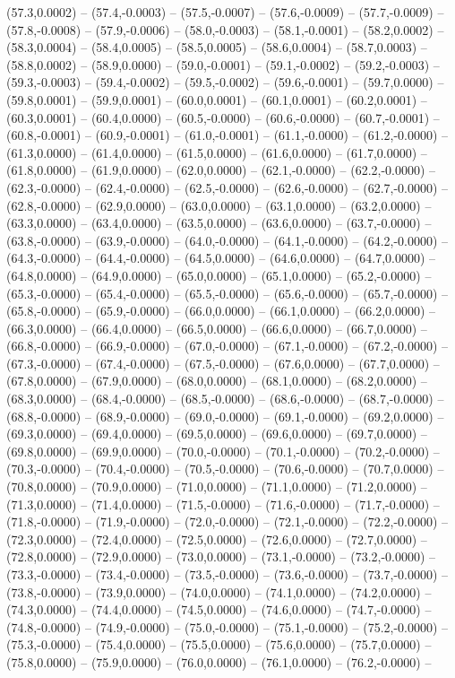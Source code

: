 \documentclass{SVnote}
\begin{document}
(57.3,0.0002) -- (57.4,-0.0003) -- (57.5,-0.0007) -- (57.6,-0.0009) -- (57.7,-0.0009) -- (57.8,-0.0008) -- (57.9,-0.0006) -- (58.0,-0.0003) -- (58.1,-0.0001) -- (58.2,0.0002) -- (58.3,0.0004) -- (58.4,0.0005) -- (58.5,0.0005) -- (58.6,0.0004) -- (58.7,0.0003) -- (58.8,0.0002) -- (58.9,0.0000) -- (59.0,-0.0001) -- (59.1,-0.0002) -- (59.2,-0.0003) -- (59.3,-0.0003) -- (59.4,-0.0002) -- (59.5,-0.0002) -- (59.6,-0.0001) -- (59.7,0.0000) -- (59.8,0.0001) -- (59.9,0.0001) -- (60.0,0.0001) -- (60.1,0.0001) -- (60.2,0.0001) -- (60.3,0.0001) -- (60.4,0.0000) -- (60.5,-0.0000) -- (60.6,-0.0000) -- (60.7,-0.0001) -- (60.8,-0.0001) -- (60.9,-0.0001) -- (61.0,-0.0001) -- (61.1,-0.0000) -- (61.2,-0.0000) -- (61.3,0.0000) -- (61.4,0.0000) -- (61.5,0.0000) -- (61.6,0.0000) -- (61.7,0.0000) -- (61.8,0.0000) -- (61.9,0.0000) -- (62.0,0.0000) -- (62.1,-0.0000) -- (62.2,-0.0000) -- (62.3,-0.0000) -- (62.4,-0.0000) -- (62.5,-0.0000) -- (62.6,-0.0000) -- (62.7,-0.0000) -- (62.8,-0.0000) -- (62.9,0.0000) -- (63.0,0.0000) -- (63.1,0.0000) -- (63.2,0.0000) -- (63.3,0.0000) -- (63.4,0.0000) -- (63.5,0.0000) -- (63.6,0.0000) -- (63.7,-0.0000) -- (63.8,-0.0000) -- (63.9,-0.0000) -- (64.0,-0.0000) -- (64.1,-0.0000) -- (64.2,-0.0000) -- (64.3,-0.0000) -- (64.4,-0.0000) -- (64.5,0.0000) -- (64.6,0.0000) -- (64.7,0.0000) -- (64.8,0.0000) -- (64.9,0.0000) -- (65.0,0.0000) -- (65.1,0.0000) -- (65.2,-0.0000) -- (65.3,-0.0000) -- (65.4,-0.0000) -- (65.5,-0.0000) -- (65.6,-0.0000) -- (65.7,-0.0000) -- (65.8,-0.0000) -- (65.9,-0.0000) -- (66.0,0.0000) -- (66.1,0.0000) -- (66.2,0.0000) -- (66.3,0.0000) -- (66.4,0.0000) -- (66.5,0.0000) -- (66.6,0.0000) -- (66.7,0.0000) -- (66.8,-0.0000) -- (66.9,-0.0000) -- (67.0,-0.0000) -- (67.1,-0.0000) -- (67.2,-0.0000) -- (67.3,-0.0000) -- (67.4,-0.0000) -- (67.5,-0.0000) -- (67.6,0.0000) -- (67.7,0.0000) -- (67.8,0.0000) -- (67.9,0.0000) -- (68.0,0.0000) -- (68.1,0.0000) -- (68.2,0.0000) -- (68.3,0.0000) -- (68.4,-0.0000) -- (68.5,-0.0000) -- (68.6,-0.0000) -- (68.7,-0.0000) -- (68.8,-0.0000) -- (68.9,-0.0000) -- (69.0,-0.0000) -- (69.1,-0.0000) -- (69.2,0.0000) -- (69.3,0.0000) -- (69.4,0.0000) -- (69.5,0.0000) -- (69.6,0.0000) -- (69.7,0.0000) -- (69.8,0.0000) -- (69.9,0.0000) -- (70.0,-0.0000) -- (70.1,-0.0000) -- (70.2,-0.0000) -- (70.3,-0.0000) -- (70.4,-0.0000) -- (70.5,-0.0000) -- (70.6,-0.0000) -- (70.7,0.0000) -- (70.8,0.0000) -- (70.9,0.0000) -- (71.0,0.0000) -- (71.1,0.0000) -- (71.2,0.0000) -- (71.3,0.0000) -- (71.4,0.0000) -- (71.5,-0.0000) -- (71.6,-0.0000) -- (71.7,-0.0000) -- (71.8,-0.0000) -- (71.9,-0.0000) -- (72.0,-0.0000) -- (72.1,-0.0000) -- (72.2,-0.0000) -- (72.3,0.0000) -- (72.4,0.0000) -- (72.5,0.0000) -- (72.6,0.0000) -- (72.7,0.0000) -- (72.8,0.0000) -- (72.9,0.0000) -- (73.0,0.0000) -- (73.1,-0.0000) -- (73.2,-0.0000) -- (73.3,-0.0000) -- (73.4,-0.0000) -- (73.5,-0.0000) -- (73.6,-0.0000) -- (73.7,-0.0000) -- (73.8,-0.0000) -- (73.9,0.0000) -- (74.0,0.0000) -- (74.1,0.0000) -- (74.2,0.0000) -- (74.3,0.0000) -- (74.4,0.0000) -- (74.5,0.0000) -- (74.6,0.0000) -- (74.7,-0.0000) -- (74.8,-0.0000) -- (74.9,-0.0000) -- (75.0,-0.0000) -- (75.1,-0.0000) -- (75.2,-0.0000) -- (75.3,-0.0000) -- (75.4,0.0000) -- (75.5,0.0000) -- (75.6,0.0000) -- (75.7,0.0000) -- (75.8,0.0000) -- (75.9,0.0000) -- (76.0,0.0000) -- (76.1,0.0000) -- (76.2,-0.0000) -- 
\end{document}
